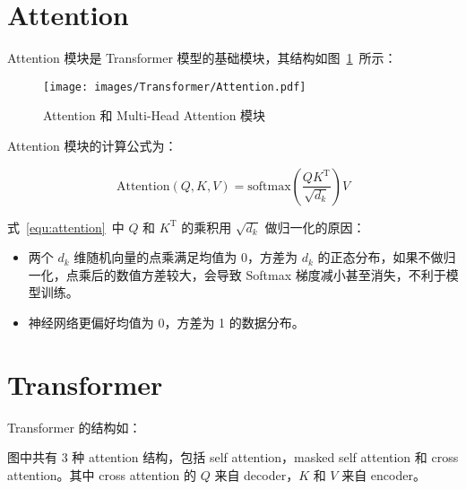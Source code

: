 \section{Attention}

Attention 模块是 Transformer 模型的基础模块，其结构如图~\ref{fig:attention}~所示：

\begin{figure}[ht]
  \centering
  \texttt{[image: images/Transformer/Attention.pdf]}
  \caption{Attention 和 Multi-Head Attention 模块}\label{fig:attention}
\end{figure}

Attention 模块的计算公式为：

\begin{equation}
  \label{equ:attention}
    \mathrm{Attention}(Q, K, V) = \mathrm{softmax} \left( \frac{QK^{\mathrm
    T}}{\sqrt{d_k}} \right) V
\end{equation}

式~\ref{equ:attention}~中 $Q$ 和 $K^{\mathrm{T}}$ 的乘积用 $\sqrt{d_k}$
做归一化的原因：

\begin{itemize}
  \item 两个 $d_k$ 维随机向量的点乘满足均值为 0，方差为 $d_k$
      的正态分布，如果不做归一化，点乘后的数值方差较大，会导致 Softmax
        梯度减小甚至消失，不利于模型训练。
  \item 神经网络更偏好均值为 0，方差为 1 的数据分布。
\end{itemize}

\section{Transformer}

Transformer 的结构如：

图中共有 3 种 attention 结构，包括 self attention，masked self attention 和
cross attention。其中 cross attention 的 $Q$ 来自 decoder，$K$ 和 $V$ 来自 encoder。


